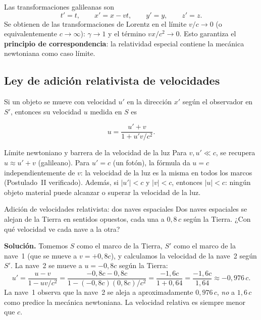 Las transformaciones galileanas son
\[
  t' = t, \qquad x' = x - vt, \qquad y' = y, \qquad z' = z.
\]
Se obtienen de las transformaciones de Lorentz en el límite $v/c \to 0$ (o equivalentemente $c \to \infty$): $\gamma \to 1$ y el término $vx/c^2 \to 0$. Esto garantiza el \textbf{principio de correspondencia}: la relatividad especial contiene la mecánica newtoniana como caso límite.

\subsection{Ley de adición relativista de velocidades}

Si un objeto se mueve con velocidad $u'$ en la dirección $x'$ según el observador en $S'$, entonces su velocidad $u$ medida en $S$ es

\begin{equation}
  u = \frac{u' + v}{1 + u'v/c^2}.
  \label{eq:adicion_vel}
\end{equation}

\begin{observacion}{Límite newtoniano y barrera de la velocidad de la luz}{}
Para $v, u' \ll c$, se recupera $u \approx u' + v$ (galileano). Para $u' = c$ (un fotón), la fórmula da $u = c$ independientemente de $v$: la velocidad de la luz es la misma en todos los marcos (Postulado~II verificado). Además, si $|u'| < c$ y $|v| < c$, entonces $|u| < c$: ningún objeto material puede alcanzar o superar la velocidad de la luz.
\end{observacion}

\begin{ejemplo}{Adición de velocidades relativista: dos naves espaciales}{}
Dos naves espaciales se alejan de la Tierra en sentidos opuestos, cada una a $0{,}8\,c$ según la Tierra. ¿Con qué velocidad ve cada nave a la otra?

\textbf{Solución.} Tomemos $S$ como el marco de la Tierra, $S'$ como el marco de la nave~1 (que se mueve a $v = +0{,}8c$), y calculamos la velocidad de la nave~2 según $S'$. La nave~2 se mueve a $u = -0{,}8c$ según la Tierra:
\[
  u' = \frac{u - v}{1 - uv/c^2} = \frac{-0{,}8c - 0{,}8c}{1 - (-0{,}8c)(0{,}8c)/c^2}
  = \frac{-1{,}6c}{1 + 0{,}64} = \frac{-1{,}6c}{1{,}64} \approx -0{,}976\,c.
\]
La nave~1 observa que la nave~2 se aleja a aproximadamente $0{,}976\,c$, \emph{no} a $1{,}6\,c$ como predice la mecánica newtoniana. La velocidad relativa es siempre menor que $c$.
\end{ejemplo}

